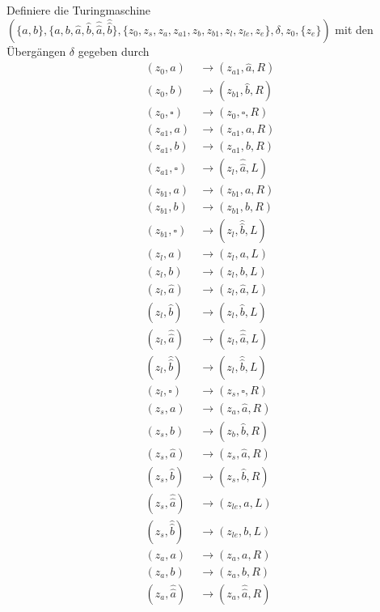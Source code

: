 \documentclass[10pt,a4paper]{article}
\begin{document}
Definiere die Turingmaschine $(\{ a, b \}, \{ a, b, \hat{a}, \hat{b}, \hat{\hat{a}}, \hat{\hat{b}} \}, \{ z_{0}, z_{s}, z_{a}, z_{a1}, z_{b}, z_{b1}, z_{l}, z_{le}, z_{e} \}, \delta, z_{0}, \{ z_{e} \})$ mit den Übergängen $\delta$ gegeben durch
\begin{align*}
  (z_{0}, a) & \rightarrow (z_{a1}, \hat{a}, R)\\
  (z_{0}, b) & \rightarrow (z_{b1}, \hat{b}, R)\\
  (z_{0}, \square) & \rightarrow (z_{0}, \square, R)\\
  (z_{a1}, a) & \rightarrow (z_{a1}, a, R)\\
  (z_{a1}, b) & \rightarrow (z_{a1}, b, R)\\
  (z_{a1}, \square) & \rightarrow (z_{l}, \hat{\hat{a}}, L)\\
  (z_{b1}, a) & \rightarrow (z_{b1}, a, R)\\
  (z_{b1}, b) & \rightarrow (z_{b1}, b, R)\\
  (z_{b1}, \square) & \rightarrow (z_{l}, \hat{\hat{b}}, L)\\
  (z_{l}, a) & \rightarrow (z_{l}, a, L)\\
  (z_{l}, b) & \rightarrow (z_{l}, b, L)\\
  (z_{l}, \hat{a}) & \rightarrow (z_{l}, \hat{a}, L)\\
  (z_{l}, \hat{b}) & \rightarrow (z_{l}, \hat{b}, L)\\
  (z_{l}, \hat{\hat{a}}) & \rightarrow (z_{l}, \hat{\hat{a}}, L)\\
  (z_{l}, \hat{\hat{b}}) & \rightarrow (z_{l}, \hat{\hat{b}}, L)\\
  (z_{l}, \square) & \rightarrow (z_{s}, \square, R)\\
  (z_{s}, a) & \rightarrow (z_{a}, \hat{a}, R)\\
  (z_{s}, b) & \rightarrow (z_{b}, \hat{b}, R)\\
  (z_{s}, \hat{a}) & \rightarrow (z_{s}, \hat{a}, R)\\
  (z_{s}, \hat{b}) & \rightarrow (z_{s}, \hat{b}, R)\\
  (z_{s}, \hat{\hat{a}}) & \rightarrow (z_{le}, a, L)\\
  (z_{s}, \hat{\hat{b}}) & \rightarrow (z_{le}, b, L)\\
  (z_{a}, a) & \rightarrow (z_{a}, a, R)\\
  (z_{a}, b) & \rightarrow (z_{a}, b, R)\\
  (z_{a}, \hat{\hat{a}}) & \rightarrow (z_{a}, \hat{\hat{a}}, R)\\

\end{align*}
\end{document}
